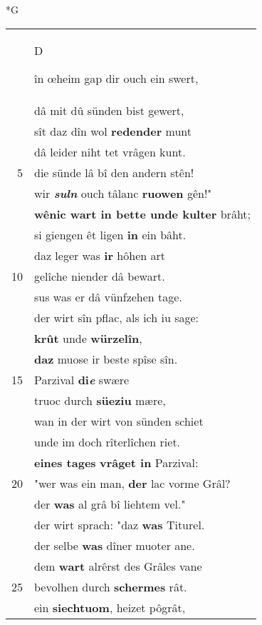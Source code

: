 \documentclass[8pt,a4paper,notitlepage]{article}
\begin{document}
\newpage
\begin{table}[ht]
\begin{minipage}[t]{0.5\linewidth}
\small
\begin{center}*G
\end{center}
\begin{tabular}{rl}
 & \begin{large}D\end{large}în œheim gap dir ouch ein swert,\\ 
 & dâ mit dû sünden bist gewert,\\ 
 & sît daz dîn wol \textbf{redender} munt\\ 
 & dâ leider niht tet vrâgen kunt.\\ 
5 & die sünde lâ bî den andern stên!\\ 
 & wir \textit{\textbf{suln}} ouch tâlanc \textbf{ruowen} gên!"\\ 
 & \textbf{wênic wart in bette unde kulter} brâht;\\ 
 & si giengen êt ligen \textbf{in} ein bâht.\\ 
 & daz leger was \textbf{ir} hôhen art\\ 
10 & gelîche niender dâ bewart.\\ 
 & sus was er dâ vünfzehen tage.\\ 
 & der wirt sîn pflac, als ich iu sage:\\ 
 & \textbf{krût} unde \textbf{würzelîn},\\ 
 & \textbf{daz} muose ir beste spîse sîn.\\ 
15 & Parzival \textbf{di\textit{e}} swære\\ 
 & truoc durch \textbf{süeziu} mære,\\ 
 & wan in der wirt von sünden schiet\\ 
 & unde im doch rîterlîchen riet.\\ 
 & \textbf{eines tages} \textbf{vrâget in} Parzival:\\ 
20 & "wer was ein man, \textbf{der} lac vorme Grâl?\\ 
 & der \textbf{was} al grâ bî liehtem vel."\\ 
 & der wirt sprach: "daz \textbf{was} Titurel.\\ 
 & der selbe \textbf{was} dîner muoter ane.\\ 
 & dem \textbf{wart} alrêrst des Grâles vane\\ 
25 & bevolhen durch \textbf{schermes} rât.\\ 
 & ein \textbf{siechtuom}, heizet pôgrât,\\ 

\end{tabular}
\end{minipage}
\end{table}
\end{document}
